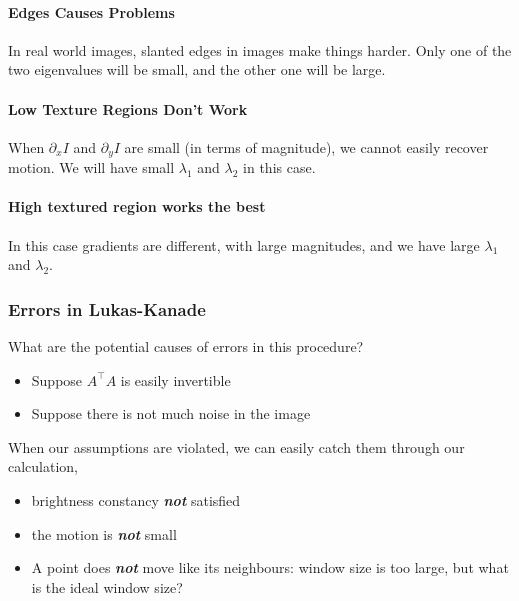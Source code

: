 \documentclass[11pt]{article}
\begin{document}
\paragraph{Edges Causes Problems}
In real world images, slanted edges in images make things harder. Only one of the two eigenvalues will be small, and the other one will be large. 

\paragraph{Low Texture Regions Don't Work} When $\partial_x I$ and $\partial_y I$ are small (in terms of magnitude), we cannot easily recover motion. We will have small $\lambda_1$ and $\lambda_2$ in this case. 

\paragraph{High textured region works the best} In this case gradients are different, with large magnitudes, and we have large $\lambda_1$ and $\lambda_2$. 


\subsubsection{Errors in Lukas-Kanade}
What are the potential causes of errors in this procedure? 
\begin{itemize}
	\item Suppose $A^\top A$ is easily invertible
	\item Suppose there is not much noise in the image
\end{itemize}
When our assumptions are violated, we can easily catch them through our calculation, 
\begin{itemize}
	\item brightness constancy \textit{\textbf{not}} satisfied
	\item the motion is \textit{\textbf{not}} small
	\item A point does \textit{\textbf{not}} move like its neighbours: window size is too large, but what is the ideal window size? 
\end{itemize}
\end{document}
